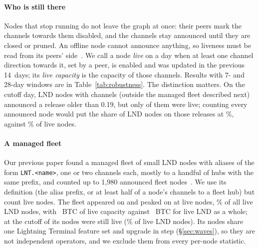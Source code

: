 \paragraph{Who is still there}
Nodes that stop running do not leave the graph at once: their peers mark the channels towards them disabled, and
the channels stay announced until they are closed or pruned. An offline node cannot announce anything, so liveness
must be read from its peers' side~\cite{kumar2026clientdiversity}. We call a node \emph{live} on a day when at least
one channel direction towards it, set by a peer, is enabled and was updated in the previous 14~days; its \emph{live
capacity} is the capacity of those channels. Results with 7- and 28-day windows are in
Table~\ref{tab:robustness}. The distinction matters. On the cutoff day, \NOldLndChan{} LND nodes with channels
(outside the managed fleet described next) announced a release older than 0.19, but only \NOldLndLive{} of them were
live; counting every announced node would put the share of LND nodes on those releases at \PctOldLndNaive\%, against
\PctOldLndLive\% of live nodes.

\paragraph{A managed fleet}
Our previous paper found a managed fleet of small LND nodes with aliases of the form \texttt{LNT.<name>}, one or two
channels each, mostly to a handful of hubs with the same prefix, and counted up to 1,980 announced fleet
nodes~\cite{kumar2026clientdiversity}. We use its definition (the alias prefix, or at least half of a node's channels
to a fleet hub) but count live nodes. The fleet appeared on \FleetFirstDay{} and peaked on \FleetPeakDay{} at
\FleetPeakNodes{} live nodes, \FleetPeakShare\% of all live LND nodes, with \FleetPeakCap{}~BTC of live capacity
against \FleetPeakTotalCap{}~BTC for live LND as a whole; at the cutoff \FleetCutoffNodes{} of its nodes were still
live (\FleetCutoffShare\% of live LND nodes). Its nodes share one Lightning Terminal feature set and upgrade in step
(\S\ref{sec:waves}), so they are not independent operators, and we exclude them from every per-node statistic.
